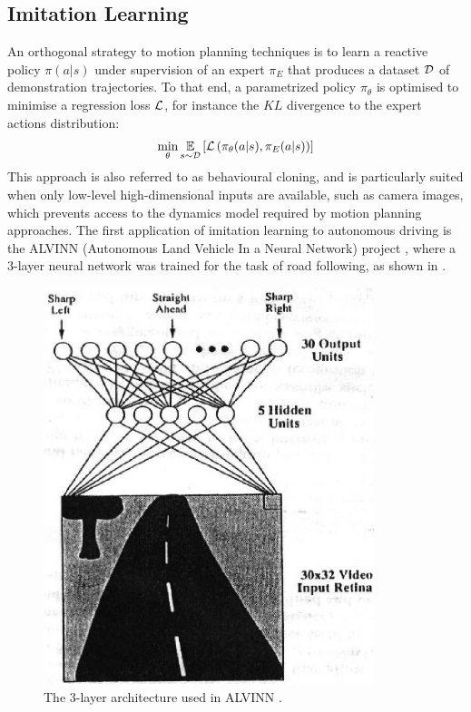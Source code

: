 \subsection{Imitation Learning}

An orthogonal strategy to motion planning techniques is to learn a reactive policy $\pi(a|s)$ under supervision of an expert $\pi_E$ that produces a dataset $\mathcal{D}$ of demonstration trajectories. To that end, a parametrized policy $\pi_\theta$ is optimised to minimise a regression loss $\mathcal{L}$, for instance the $KL$ divergence to the expert actions distribution:
\begin{equation*}
\min_\theta \operatorname*{\mathbb{E}}_{s\sim \mathcal{D}} \left[\mathcal{L}\left(\pi_{\theta}(a|s), \pi_E(a|s)\right)\right]
\end{equation*}
This approach is also referred to as behavioural cloning, and is particularly suited when only low-level high-dimensional inputs are available, such as camera images, which prevents access to the dynamics model required by motion planning approaches. 
The first application of imitation learning to autonomous driving is the ALVINN (Autonomous Land Vehicle In a Neural Network) project \citep{Pomerleau89}, where a 3-layer neural network was trained for the task of road following, as shown in .
\begin{figure}[th]
	\centering
	\includegraphics[width=0.4\linewidth]{img/alvinn}
	\caption{The 3-layer architecture used in ALVINN \citep{Pomerleau89}.}
	\label{fig:alvinn}
\end{figure}

